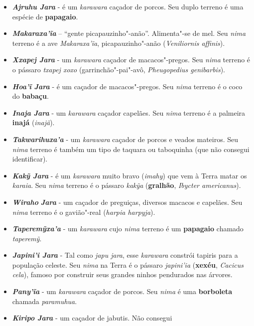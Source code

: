 \begin{itemize}
  \emph{karawara}. Tem a árvore \textbf{pau"-d'arco} como \emph{nima}
  terrestre.
\item
  \emph{\textbf{Ajruhu Jara}} - é um \emph{karawara} caçador de porcos.
  Seu duplo terreno é uma espécie de \textbf{papagaio}.
\item
  \emph{\textbf{Makaraxa'ĩa}} -- ``gente picapauzinho"-anão''.
  Alimenta"-se de mel. Seu \emph{nima} terreno é a ave
  \emph{Makaraxa'ĩa}, picapauzinho"-anão (\emph{Veniliornis affinis}).
\item
  \emph{\textbf{Xxapej Jara}} - um \emph{karawara} caçador de
  macacos"-pregos. Seu \emph{nima} terreno é o pássaro \emph{txapej xoxo}
  (garrinchão"-pai"-avô, \emph{Pheugopedius genibarbis}).
\item
  \textbf{\emph{Hoa'ĩ} \emph{Jara}} - é um caçador de macacos"-pregos.
  Seu \emph{nima} terreno é o coco do \textbf{babaçu}.
\item
  \textbf{\emph{Inaja} \emph{Jara}} - um \emph{karawara} caçador
  capelães. Seu \emph{nima} terreno é a palmeira \textbf{inajá}
  (\emph{inajã}).
\item
  \emph{\textbf{Takwarihuxa'a}} - um \emph{karawara} caçador de porcos e
  veados mateiros. Seu \emph{nima} terreno é também um tipo de taquara
  ou taboquinha (que não consegui identificar).
\item
  \emph{\textbf{Kakỹ Jara}} - é um \emph{karawara} muito bravo
  (\emph{imahy}) que vem à Terra matar os \emph{karaia}. Seu \emph{nima}
  terreno é o pássaro \emph{kakỹa} (\textbf{gralhão}, \emph{Ibycter
  americanus}).
\item
  \emph{\textbf{Wiraho}} \emph{\textbf{Jara}} - um caçador de preguiças,
  diversos macacos e capelães. Seu \emph{nima} terreno é o gavião"-real
  (\emph{harpia harpyja}).
\item
  \emph{\textbf{Taperemỹxa'a}} - um \emph{karawara} cujo \emph{nima}
  terreno é um \textbf{papagaio} chamado \emph{taperemỹ}.
\item
  \emph{\textbf{Japini'i Jara}} - Tal como \emph{japu jara}, esse
  \emph{karawara} constrói tapiris para a população celeste. Seu
  \emph{nima} na Terra é o pássaro \emph{japini'ia} (\textbf{xexéu},
  \emph{Cacicus} \emph{cela}), famoso por construir seus grandes ninhos
  pendurados nas árvores.
\item
  \emph{\textbf{Pany'ĩa}} - um \emph{karawara} caçador de porcos. Seu
  \emph{nima} é uma \textbf{borboleta} chamada \emph{paramuhua}.
\item
  \emph{\textbf{Kiripo Jara}} - um caçador de jabutis. Não consegui

\end{itemize}
